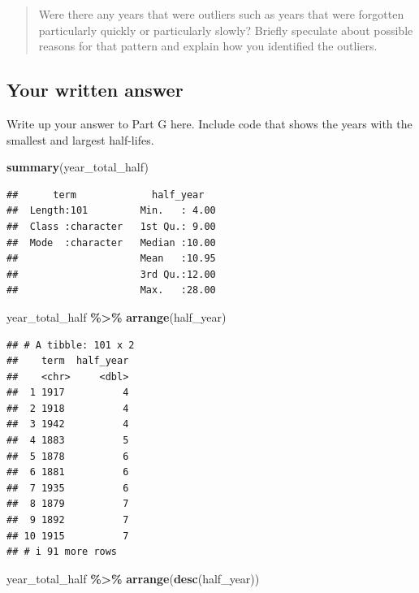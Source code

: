 \documentclass[
]{article}
\newenvironment{Shaded}{\begin{snugshade}}{\end{snugshade}}
\newcommand{\FunctionTok}[1]{\textcolor[rgb]{0.13,0.29,0.53}{\textbf{#1}}}
\newcommand{\NormalTok}[1]{#1}
\newcommand{\SpecialCharTok}[1]{\textcolor[rgb]{0.81,0.36,0.00}{\textbf{#1}}}
\begin{document}
\begin{quote}
Were there any years that were outliers such as years that were
forgotten particularly quickly or particularly slowly? Briefly speculate
about possible reasons for that pattern and explain how you identified
the outliers.
\end{quote}

\hypertarget{your-written-answer-5}{%
\subsection{Your written answer}\label{your-written-answer-5}}

Write up your answer to Part G here. Include code that shows the years
with the smallest and largest half-lifes.

\begin{Shaded}
\begin{Highlighting}[]
\FunctionTok{summary}\NormalTok{(year\_total\_half)}
\end{Highlighting}
\end{Shaded}

\begin{verbatim}
##      term             half_year    
##  Length:101         Min.   : 4.00  
##  Class :character   1st Qu.: 9.00  
##  Mode  :character   Median :10.00  
##                     Mean   :10.95  
##                     3rd Qu.:12.00  
##                     Max.   :28.00
\end{verbatim}

\begin{Shaded}
\begin{Highlighting}[]
\NormalTok{year\_total\_half }\SpecialCharTok{\%\textgreater{}\%} \FunctionTok{arrange}\NormalTok{(half\_year)}
\end{Highlighting}
\end{Shaded}

\begin{verbatim}
## # A tibble: 101 x 2
##    term  half_year
##    <chr>     <dbl>
##  1 1917          4
##  2 1918          4
##  3 1942          4
##  4 1883          5
##  5 1878          6
##  6 1881          6
##  7 1935          6
##  8 1879          7
##  9 1892          7
## 10 1915          7
## # i 91 more rows
\end{verbatim}

\begin{Shaded}
\begin{Highlighting}[]
\NormalTok{year\_total\_half }\SpecialCharTok{\%\textgreater{}\%} \FunctionTok{arrange}\NormalTok{(}\FunctionTok{desc}\NormalTok{(half\_year))}
\end{Highlighting}
\end{Shaded}
\end{document}
